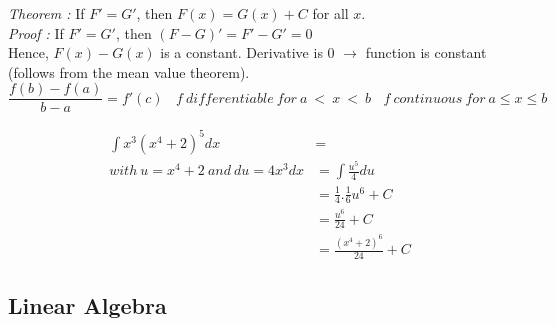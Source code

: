 \documentclass{article}
\begin{document}
            \textit{Theorem : } If $F' = G'$, then $F(x)=G(x)+C$ for all $x$.\\
            \textit{Proof :} If $F' = G'$, then $(F - G)' = F' - G' = 0$\\
            Hence, $F(x)-G(x)$ is a constant. Derivative is 0 $\rightarrow$ function is constant (follows from the mean value theorem).\\

            \[
                \label{Mean value theorem}
                \frac{f(b) - f(a)}{b-a} = f'(c)~ ~ ~ ~
                f ~differentiable ~for~ a~ < ~x ~< ~b ~ ~ ~ ~
                f ~continuous ~for~ a \leq x \leq b
            \]

            \begin{align*}
                \int x^3 (x^4 + 2)^5 dx &= \\
                with~ u = x^4 +2 ~and ~du = 4x^3 dx
                 &= \int \frac{u^5}{4}du\\
                 &= \frac{1}{4}.\frac{1}{6}u^6+C\\
                 &= \frac{u^6}{24}+C\\
                 &= \frac{(x^4 +2)^6}{24}+C
            \end{align*}



        \subsection{Linear Algebra}
\end{document}
